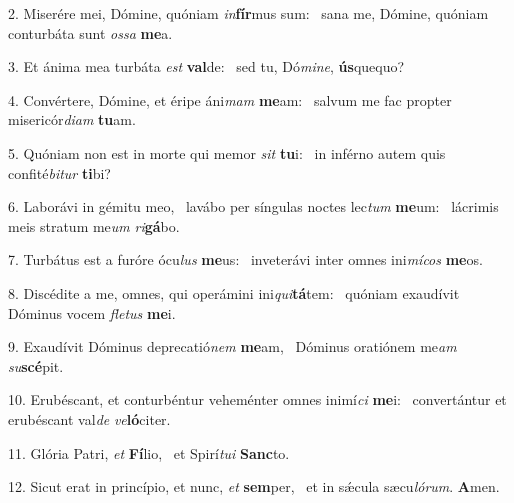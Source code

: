 2. Miserére mei, Dómine, quóniam \textit{in}\textbf{fír}mus sum: \ast\  sana me, Dómine, quóniam conturbáta sunt \textit{os}\textit{sa} \textbf{me}a.\

3. Et ánima mea turbáta \textit{est} \textbf{val}de: \ast\  sed tu, Dó\textit{mi}\textit{ne}, \textbf{ús}quequo?\

4. Convértere, Dómine, et éripe áni\textit{mam} \textbf{me}am: \ast\  salvum me fac propter misericór\textit{di}\textit{am} \textbf{tu}am.\

5. Quóniam non est in morte qui memor \textit{sit} \textbf{tu}i: \ast\  in inférno autem quis confité\textit{bi}\textit{tur} \textbf{ti}bi?\

6. Laborávi in gémitu meo, \dag\  lavábo per síngulas noctes lec\textit{tum} \textbf{me}um: \ast\  lácrimis meis stratum me\textit{um} \textit{ri}\textbf{gá}bo.\

7. Turbátus est a furóre ócu\textit{lus} \textbf{me}us: \ast\  inveterávi inter omnes ini\textit{mí}\textit{cos} \textbf{me}os.\

8. Discédite a me, omnes, qui operámini ini\textit{qui}\textbf{tá}tem: \ast\  quóniam exaudívit Dóminus vocem \textit{fle}\textit{tus} \textbf{me}i.\

9. Exaudívit Dóminus deprecatió\textit{nem} \textbf{me}am, \ast\  Dóminus oratiónem me\textit{am} \textit{su}\textbf{scé}pit.\

10. Erubéscant, et conturbéntur veheménter omnes inimí\textit{ci} \textbf{me}i: \ast\  convertántur et erubéscant val\textit{de} \textit{ve}\textbf{ló}citer.\

11. Glória Patri, \textit{et} \textbf{Fí}lio, \ast\  et Spirí\textit{tu}\textit{i} \textbf{Sanc}to.\

12. Sicut erat in princípio, et nunc, \textit{et} \textbf{sem}per, \ast\  et in sǽcula sæcu\textit{ló}\textit{rum}. \textbf{A}men.\

